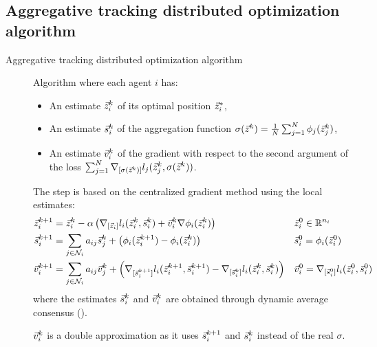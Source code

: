 \subsection{Aggregative tracking distributed optimization algorithm}

\begin{description}
    \item[Aggregative tracking distributed optimization algorithm] 
    Algorithm where each agent $i$ has:
    \begin{itemize}
        \item An estimate ${\vec{z}}_i^k$ of its optimal position ${\vec{z}}_i^*$,
        \item An estimate ${\vec{s}}_i^k$ of the aggregation function $\sigma({\vec{z}}^k) = \frac{1}{N} \sum_{j=1}^{N} \phi_j({\vec{z}}_j^k)$,
        \item An estimate ${\vec{v}}_i^k$ of the gradient with respect to the second argument of the loss $\sum_{j=1}^{N} \nabla_{[\sigma({\vec{z}}^k)]} l_j({\vec{z}}_j^k, \sigma({\vec{z}}^k))$.
    \end{itemize}

    The step is based on the centralized gradient method using the local estimates:
    \[
        \begin{aligned}
            {\vec{z}}_i^{k+1} &= {\vec{z}}_i^k - \alpha \left( \nabla_{[{\vec{z}}_i]} l_i({\vec{z}}_i^k, {\vec{s}}_i^k) + {\vec{v}}_i^k \nabla \phi_i({\vec{z}}_i^k) \right) && {\vec{z}}_i^0 \in \mathbb{R}^{n_i} \\
            {\vec{s}}_i^{k+1} &= \sum_{j \in \mathcal{N}_i} a_{ij} {\vec{s}}_j^k + \left( \phi_i({\vec{z}}_i^{k+1}) - \phi_i({\vec{z}}_i^k) \right) && {\vec{s}}_i^0 = \phi_i({\vec{z}}_i^0) \\
            {\vec{v}}_i^{k+1} &= \sum_{j \in \mathcal{N}_i} a_{ij} {\vec{v}}_j^k + \left( \nabla_{[{\vec{s}}_i^{k+1}]} l_i({\vec{z}}_i^{k+1}, {\vec{s}}_i^{k+1}) - \nabla_{[{\vec{s}}_i^k]} l_i({\vec{z}}_i^k, {\vec{s}}_i^k) \right) && {\vec{v}}_i^0 = \nabla_{[{\vec{s}}_i^0]} l_i({\vec{z}}_i^0, {\vec{s}}_i^0) \\
        \end{aligned}
    \]
    where the estimates ${\vec{s}}_i^k$ and ${\vec{v}}_i^k$ are obtained through dynamic average consensus ().

    \begin{remark}
        ${\vec{v}}_i^k$ is a double approximation as it uses ${\vec{s}}_i^{k+1}$ and ${\vec{s}}_i^k$ instead of the real $\sigma$.
    \end{remark}


\end{description}

